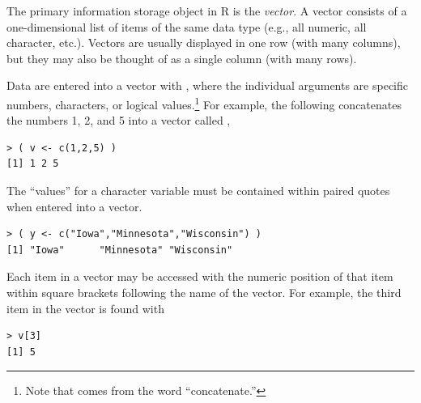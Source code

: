 \documentclass[10pt,openany]{book}\usepackage[]{graphicx}\usepackage[]{color}
\makeatletter
\newenvironment{kframe}{%
 \def\at@end@of@kframe{}%
 \ifinner\ifhmode%
  \def\at@end@of@kframe{\end{minipage}}%
  \begin{minipage}{\columnwidth}%
 \fi\fi%
 \def\FrameCommand##1{\hskip\@totalleftmargin \hskip-\fboxsep
 \colorbox{shadecolor}{##1}\hskip-\fboxsep
     \hskip-\linewidth \hskip-\@totalleftmargin \hskip\columnwidth}%
 \MakeFramed {\advance\hsize-\width
   \@totalleftmargin\z@ \linewidth\hsize
   \@setminipage}}%
 {\par\unskip\endMakeFramed%
 \at@end@of@kframe}
\newenvironment{knitrout}{}{} %
\makeatother
\begin{document}
The primary information storage object in R is the \emph{vector}.  A vector consists of a one-dimensional list of items of the same data type (e.g., all numeric, all character, etc.).  Vectors are usually displayed in one row (with many columns), but they may also be thought of as a single column (with many rows).


Data are entered into a vector with , where the individual arguments are specific numbers, characters, or logical values.\footnote{Note that  comes from the word ``concatenate.''}  For example, the following concatenates the numbers 1, 2, and 5 into a vector called ,
\begin{knitrout}
\color{fgcolor}\begin{kframe}
\begin{verbatim}
> ( v <- c(1,2,5) )
[1] 1 2 5
\end{verbatim}
\end{kframe}
\end{knitrout}

The ``values'' for a character variable must be contained within paired quotes when entered into a vector.
\begin{knitrout}
\color{fgcolor}\begin{kframe}
\begin{verbatim}
> ( y <- c("Iowa","Minnesota","Wisconsin") )
[1] "Iowa"      "Minnesota" "Wisconsin"
\end{verbatim}
\end{kframe}
\end{knitrout}

Each item in a vector may be accessed with the numeric position of that item within square brackets following the name of the vector.  For example, the third item in the  vector is found with
\begin{knitrout}
\color{fgcolor}\begin{kframe}
\begin{verbatim}
> v[3]
[1] 5
\end{verbatim}
\end{kframe}
\end{knitrout}

\end{document}

